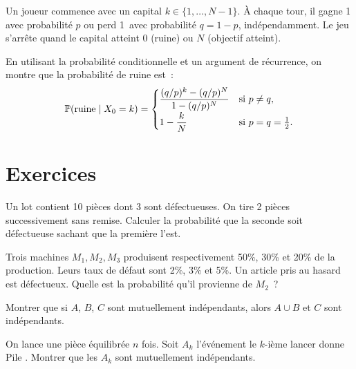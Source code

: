 \begin{exemple}
Un joueur commence avec un capital $k \in \{1, \ldots, N-1\}$. \`A chaque tour,
il gagne 1\,\texteuro{} avec probabilit\'e $p$ ou perd 1\,\texteuro{} avec probabilit\'e $q = 1-p$,
ind\'ependamment. Le jeu s'arr\^ete quand le capital atteint 0 (ruine) ou $N$
(objectif atteint).

En utilisant la probabilit\'e conditionnelle et un argument de r\'ecurrence, on
montre que la probabilit\'e de ruine est~:
\[
    \mathbb{P}(\text{ruine} \mid X_0 = k) =
    \begin{cases}
        \dfrac{(q/p)^k - (q/p)^N}{1 - (q/p)^N} & \text{si } p \neq q, \\[6pt]
        1 - \dfrac{k}{N} & \text{si } p = q = \tfrac{1}{2}.
    \end{cases}
\]
\end{exemple}

\section{Exercices}

\begin{exercice}
Un lot contient 10 pi\`eces dont 3 sont d\'efectueuses. On tire 2 pi\`eces
successivement sans remise. Calculer la probabilit\'e que la seconde soit
d\'efectueuse sachant que la premi\`ere l'est.
\end{exercice}

\begin{exercice}
Trois machines $M_1, M_2, M_3$ produisent respectivement 50\%, 30\% et 20\%
de la production. Leurs taux de d\'efaut sont 2\%, 3\% et 5\%. Un article pris au
hasard est d\'efectueux. Quelle est la probabilit\'e qu'il provienne de $M_2$~?
\end{exercice}

\begin{exercice}
Montrer que si $A$, $B$, $C$ sont mutuellement ind\'ependants, alors $A \cup B$
et $C$ sont ind\'ependants.
\end{exercice}

\begin{exercice}
On lance une pi\`ece \'equilibr\'ee $n$ fois. Soit $A_k$ l'\'ev\'enement
\og le $k$-i\`eme lancer donne Pile \fg. Montrer que les $A_k$ sont mutuellement
ind\'ependants.
\end{exercice}

